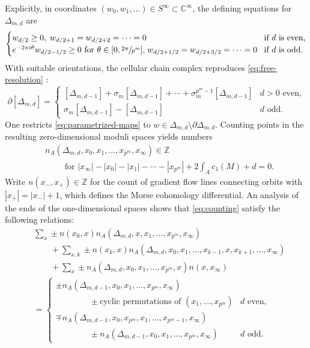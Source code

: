 \documentclass[10pt,a4paper]{amsart}
\theoremstyle{plain}
\theoremstyle{definition}
\newcommand{\bC}{{\mathbb C}}
\newcommand{\bZ}{{\mathbb Z}}
\begin{document}
Explicitly, in coordinates $(w_0,w_1,\dots) \in S^\infty \subset \bC^\infty$, the defining equations for $\Delta_{m,d}$ are
\begin{equation*}
\label{eq:cells-2}
\begin{cases}
w_{d/2} \geq 0, \; w_{d/2+1} = w_{d/2+2} = \cdots = 0 & \!\text{if $d$ is even}, \\
e^{-2\pi i \theta} w_{d/2-1/2} \geq 0 \text{ for $\theta \in [0,\sfrac{2\pi}{p^m}]$,} \;
w_{d/2+1/2} = w_{d/2+3/2} = \cdots = 0 & \!\text{if $d$ is odd.}
\end{cases}
\end{equation*}
With suitable orientations, the cellular chain complex reproduces \eqref{eq:free-resolution} \cite[Eqs.\,(2.7), (2.8)]{seidel-wilkins21}:
\begin{equation}\label{eq:cellular-differential}
\partial [\Delta_{m,d}] =
\begin{cases}
[\Delta_{m,d-1}] + \sigma_m[\Delta_{m,d-1}] + \cdots + \sigma_m^{p^m-1}[\Delta_{m,d-1}]
& \text{$d>0$ even,} \\
\sigma_m[\Delta_{m,d-1}] - [\Delta_{m,d-1}]
& \text{$d$ odd.}
\end{cases}
\end{equation}
One restricts \eqref{eq:parametrized-maps} to $w \in \Delta_{m,d} \setminus \partial \Delta_{m,d}$. Counting points in the resulting zero-dimensional moduli spaces yields numbers
\begin{equation}\label{eq:counting}
\begin{aligned}
& n_A(\Delta_{m,d},x_0,x_1,\dots,x_{p^m},x_\infty) \in \bZ
\\ & \qquad \text{ for } |x_\infty|-|x_0|-|x_1|-\cdots-|x_{p^m}| + 2\textstyle\int_A c_1(M) + d = 0.
\end{aligned}
\end{equation}
Write $n(x_-,x_+) \in \bZ$ for the count of gradient flow lines connecting orbits with $|x_+| =|x_-| + 1$, which defines the Morse cohomology differential. An analysis of the ends of the one-dimensional spaces \cite[Lem.\,4.1]{seidel-wilkins21} shows that \eqref{eq:counting} satisfy the following relations:
\begin{equation}\label{eq:parametrized-numbers}
\begin{aligned}
&
\sum_x \pm n(x_0,x) n_A(\Delta_{m,d},x,x_1,\dots,x_{p^m},x_\infty) \\ & \qquad +
\sum_{x,k} \pm n(x_k,x) n_A(\Delta_{m,d},x_0,x_1,\dots,x_{k-1},x,x_{k+1},\dots,x_\infty) \\ & \qquad +
\sum_x \pm n_A(\Delta_{m,d}, x_0,x_1,\dots,x_{p^m}, x) n(x,x_\infty) \\
&
= \begin{cases} \pm n_A(\Delta_{m,d-1},x_0,x_1,\dots,x_{p^m},x_\infty)
\\ \qquad \qquad \pm
\text{cyclic permutations of $(x_1,\dots,x_{p^m})$}
& \text{$d$ even}, \\
\mp n_A(\Delta_{m,d-1},x_0,x_{p^m},x_1,\dots,x_{p^m-1},x_\infty) \\
\qquad \qquad \pm n_A(\Delta_{m,d-1},x_0,x_1,\dots,x_{p^m},x_\infty) & \text{$d$ odd.} \end{cases}
\end{aligned}
\end{equation}
\end{document}
